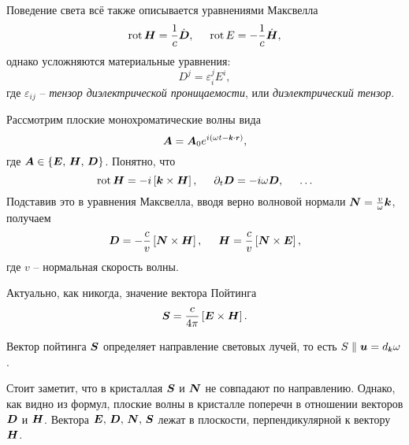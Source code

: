 Поведение света всё также описывается уравнениями Максвелла
\begin{equation*}
    \mathop{\mathrm{rot}}\nolimits \mbox{\boldmath $H$} = \frac{1}{c} \dot{\mbox{\boldmath $D$}},
    \hspace{5 mm} 
    \mathop{\mathrm{rot}}\nolimits E = - \frac{1}{c} \dot{\mbox{\boldmath $H$}},
\end{equation*}
однако усложняются материальные уравнения:
\begin{equation*}
    D^j = \varepsilon_i^j E^i,
\end{equation*}
где $\varepsilon_{ij}$ -- \textit{тензор диэлектрической проницаемости}, или \textit{диэлектрический тензор}.

Рассмотрим плоские монохроматические волны вида
\begin{equation*}
    \vc{A} = \vc{A}_0 e^{i(\omega t - \smallvc{k} \cdot \smallvc{r})}, 
\end{equation*}
где $\mbox{\boldmath $A$} \in \{\mbox{\boldmath $E$},\, \mbox{\boldmath $H$},\, \mbox{\boldmath $D$}\}$. Понятно, что
\begin{equation*}
    \mathop{\mathrm{rot}}\nolimits \mbox{\boldmath $H$} = -i \left[\mbox{\boldmath $k$} \times  \mbox{\boldmath $H$}\right],
    \hspace{5 mm} 
    \partial_t \mbox{\boldmath $D$} = - i \omega \mbox{\boldmath $D$}, \hspace{5 mm} \ldots
\end{equation*}
Подставив это в уравнения Максвелла, вводя верно волновой нормали $\mbox{\boldmath $N$} = \frac{v}{\omega} \mbox{\boldmath $k$}$, получаем
\begin{equation*}
    \mbox{\boldmath $D$} = - \frac{c}{v} \left[\mbox{\boldmath $N$} \times \mbox{\boldmath $H$}\right],
    \hspace{5 mm} 
    \mbox{\boldmath $H$} = \frac{c}{v} \left[\mbox{\boldmath $N$} \times \mbox{\boldmath $E$}\right],
\end{equation*}
где $v$ -- нормальная скорость волны. 

Актуально, как никогда, значение вектора Пойтинга
\begin{equation*}
    \mbox{\boldmath $S$} = \frac{c}{4\pi}\left[\mbox{\boldmath $E$} \times \mbox{\boldmath $H$}\right].
\end{equation*}

\begin{to_lem}
    Вектор пойтинга $\mbox{\boldmath $S$}$ определяет направление световых лучей, то есть $S \parallel \vc{u} = d_{\smallvc{k}} \omega$.
\end{to_lem}

Стоит заметит, что в кристаллая $\mbox{\boldmath $S$}$ и $\mbox{\boldmath $N$}$ не совпадают по направлению. 
Однако, как видно из формул, плоские волны в кристалле поперечн в отношении векторов $\mbox{\boldmath $D$}$ и $\mbox{\boldmath $H$}$. Вектора $\mbox{\boldmath $E$},\, \mbox{\boldmath $D$},\, \mbox{\boldmath $N$},\,  \mbox{\boldmath $S$}$ лежат в плоскости, перпендикулярной к вектору $\mbox{\boldmath $H$}$. 

